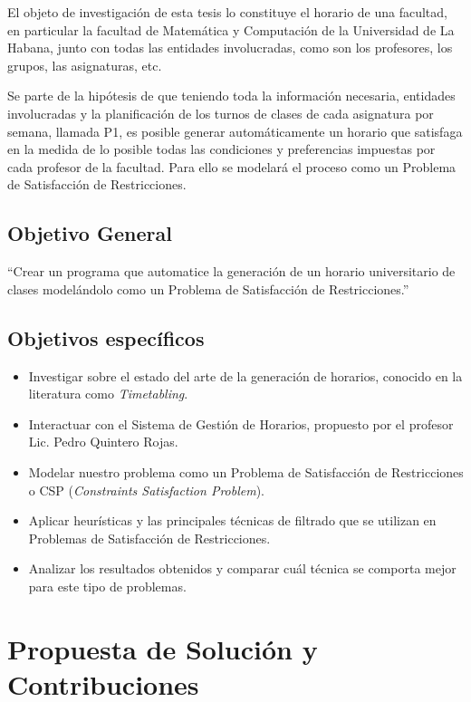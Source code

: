 \begin{introduction}
El objeto de investigación de esta tesis lo constituye el horario de una facultad, en particular la facultad de Matem\'atica y Computaci\'on de la Universidad de La Habana, junto con todas las entidades involucradas, como son los profesores, los grupos, las asignaturas, etc.

Se parte de la hipótesis de que teniendo toda la información necesaria, entidades involucradas y la
planificación de los turnos de clases de cada asignatura por semana, llamada P1, es posible generar
automáticamente un horario que satisfaga en la medida de lo posible todas las condiciones y preferencias
impuestas por cada profesor de la facultad. Para ello se modelar\'a el proceso como un Problema de Satisfacci\'on de Restricciones.


\subsection*{Objetivo General}

``Crear un programa que automatice la generación de un horario universitario de clases model\'andolo como un Problema de Satisfacci\'on de Restricciones.''

\subsection*{Objetivos específicos}

\begin{itemize}
	\item Investigar sobre el estado del arte de la generación de horarios, conocido en la literatura
		como \emph{Timetabling}.
	\item Interactuar con el Sistema de Gestión de Horarios, propuesto por el profesor Lic. Pedro
		Quintero Rojas.
	\item Modelar nuestro problema como un Problema de Satisfacción de Restricciones o CSP (\emph{Constraints 
		Satisfaction Problem}).
	\item Aplicar heurísticas y las principales técnicas de filtrado que se utilizan en Problemas de
		Satisfacción de Restricciones.
	\item Analizar los resultados obtenidos y comparar cu\'al técnica se comporta mejor para este tipo de
		problemas.
\end{itemize}

\section*{Propuesta de Solución y Contribuciones}


\end{introduction}
